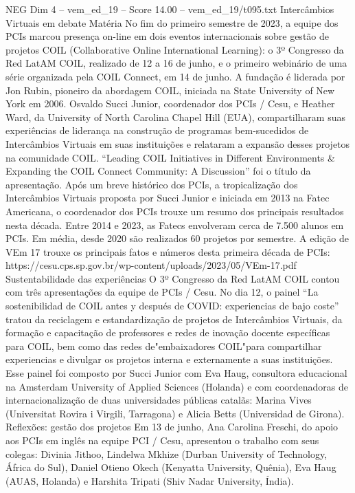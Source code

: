 \begin{textsample}{NEG Dim 4 – vem\_ed\_19 – Score 14.00 – vem\_ed\_19/t095.txt}
Intercâmbios Virtuais em debate Matéria No fim do primeiro semestre de 2023, a equipe dos PCIs marcou presença on-line em dois eventos internacionais sobre gestão de projetos COIL (Collaborative Online International Learning): o 3º Congresso da Red LatAM COIL, realizado de 12 a 16 de junho, e o primeiro webinário de uma série organizada pela COIL Connect, em 14 de junho.
A fundação é liderada por Jon Rubin, pioneiro da abordagem COIL, iniciada na State University of New York em 2006.
Osvaldo Succi Junior, coordenador dos PCIs / Cesu, e Heather Ward, da University of North Carolina Chapel Hill (EUA), compartilharam suas experiências de liderança na construção de programas bem-sucedidos de Intercâmbios Virtuais em suas instituições e relataram a expansão desses projetos na comunidade COIL. “Leading COIL Initiatives in Different Environments \& Expanding the COIL Connect Community: A Discussion” foi o título da apresentação.
Após um breve histórico dos PCIs, a tropicalização dos Intercâmbios Virtuais proposta por Succi Junior e iniciada em 2013 na Fatec Americana, o coordenador dos PCIs trouxe um resumo dos principais resultados nesta década.
Entre 2014 e 2023, as Fatecs envolveram cerca de 7.500 alunos em PCIs.
Em média, desde 2020 são realizados 60 projetos por semestre.
A edição de VEm 17 trouxe os principais fatos e números desta primeira década de PCIs: https://cesu.cps.sp.gov.br/wp-content/uploads/2023/05/VEm-17.pdf Sustentabilidade das experiências O 3º Congresso da Red LatAM COIL contou com três apresentações da equipe de PCIs / Cesu.
No dia 12, o painel “La sostenibilidad de COIL antes y después de COVID: experiencias de bajo coste” tratou da reciclagem e estandardização de projetos de Intercâmbios Virtuais, da formação e capacitação de professores e redes de inovação docente específicas para COIL, bem como das redes de"embaixadores COIL"para compartilhar experiencias e divulgar os projetos interna e externamente a suas instituições.
Esse painel foi composto por Succi Junior com Eva Haug, consultora educacional na Amsterdam University of Applied Sciences (Holanda) e com coordenadoras de internacionalização de duas universidades públicas catalãs: Marina Vives (Universitat Rovira i Virgili, Tarragona) e Alicia Betts (Universidad de Girona).
Reflexões: gestão dos projetos Em 13 de junho, Ana Carolina Freschi, do apoio aos PCIs em inglês na equipe PCI / Cesu, apresentou o trabalho com seus colegas: Divinia Jithoo, Lindelwa Mkhize (Durban University of Technology, África do Sul), Daniel Otieno Okech (Kenyatta University, Quênia), Eva Haug (AUAS, Holanda) e Harshita Tripati (Shiv Nadar University, Índia).

\end{textsample}
